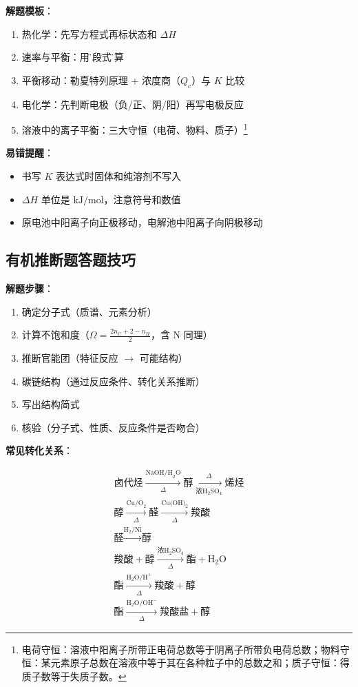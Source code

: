 \textbf{解题模板}：
\begin{enumerate}
  \item 热化学：先写方程式再标状态和 $\Delta H$
  \item 速率与平衡：用\"三段式\"计算
  \item 平衡移动：勒夏特列原理 + 浓度商（$Q_c$）与 $K$ 比较
  \item 电化学：先判断电极（负/正、阴/阳）再写电极反应
  \item 溶液中的离子平衡：三大守恒（电荷、物料、质子）\footnote{电荷守恒：溶液中阳离子所带正电荷总数等于阴离子所带负电荷总数；物料守恒：某元素原子总数在溶液中等于其在各种粒子中的总数之和；质子守恒：得质子数等于失质子数。}
\end{enumerate}

\textbf{易错提醒}：
\begin{itemize}
  \item 书写 $K$ 表达式时固体和纯溶剂不写入
  \item $\Delta H$ 单位是 $\text{kJ/mol}$，注意符号和数值
  \item 原电池中阳离子向正极移动，电解池中阳离子向阴极移动
\end{itemize}

\subsection{有机推断题答题技巧}

\textbf{解题步骤}：
\begin{enumerate}
  \item 确定分子式（质谱、元素分析）
  \item 计算不饱和度（$\Omega = \frac{2n_C+2-n_H}{2}$，含 N 同理）
  \item 推断官能团（特征反应 $\to$ 可能结构）
  \item 碳链结构（通过反应条件、转化关系推断）
  \item 写出结构简式
  \item 核验（分子式、性质、反应条件是否吻合）
\end{enumerate}

\textbf{常见转化关系}：

\[
\begin{array}{c}
\text{卤代烃} \xrightarrow[\Delta]{\text{NaOH/H}_2\text{O}} \text{醇} \xrightarrow[\text{浓}\text{H}_2\text{SO}_4]{\Delta} \text{烯烃}\\
\text{醇} \xrightarrow[\Delta]{\text{Cu/O}_2} \text{醛} \xrightarrow[\Delta]{\text{Cu(OH)}_2} \text{羧酸}\\
\text{醛} \xrightarrow{\text{H}_2/\text{Ni}} \text{醇}\\
\text{羧酸} + \text{醇} \xrightarrow[\Delta]{\text{浓}\text{H}_2\text{SO}_4} \text{酯} + \text{H}_2\text{O}\\
\text{酯} \xrightarrow[\Delta]{\text{H}_2\text{O}/\text{H}^+} \text{羧酸} + \text{醇}\\
\text{酯} \xrightarrow[\Delta]{\text{H}_2\text{O}/\text{OH}^-} \text{羧酸盐} + \text{醇}
\end{array}
\]

